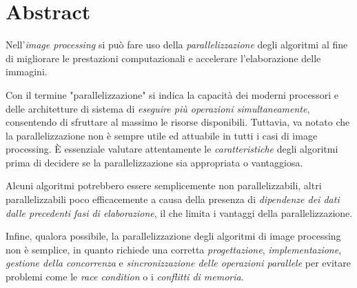 \chapter*{Abstract}\label{abstract}
Nell'\textit{image processing} si può fare uso della \textit{parallelizzazione} degli algoritmi al fine di migliorare le prestazioni computazionali e accelerare l'elaborazione delle immagini.

Con il termine "parallelizzazione" si indica la capacità dei moderni processori e delle architetture di sistema di \textit{eseguire più operazioni simultaneamente}, consentendo di sfruttare al massimo le risorse disponibili.\newline\newline
Tuttavia, va notato che la parallelizzazione non è sempre utile ed attuabile in tutti i casi di image processing. È essenziale valutare attentamente le \textit{caratteristiche} degli algoritmi prima di decidere se la parallelizzazione sia appropriata o vantaggiosa.

Alcuni algoritmi potrebbero essere semplicemente non parallelizzabili, altri parallelizzabili poco efficacemente a causa della presenza di\textit{ dipendenze dei dati dalle precedenti fasi di elaborazione}, il che limita i vantaggi della parallelizzazione.

Infine, qualora possibile, la parallelizzazione degli algoritmi di image processing non è semplice, in quanto richiede una corretta \textit{progettazione}, \textit{implementazione}, \textit{gestione della concorrenza} e \textit{sincronizzazione delle operazioni parallele} per evitare problemi come le \textit{race condition} o i \textit{conflitti di memoria}.